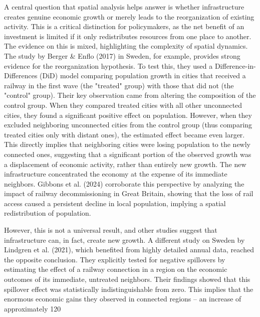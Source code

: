 \documentclass[12pt, a4paper]{article}
\begin{document}
A central question that spatial analysis helps answer is whether infrastructure creates genuine economic growth or merely leads to the reorganization of existing activity. This is a critical distinction for policymakers, as the net benefit of an investment is limited if it only redistributes resources from one place to another. The evidence on this is mixed, highlighting the complexity of spatial dynamics. The study by Berger & Enflo (2017) in Sweden, for example, provides strong evidence for the reorganization hypothesis. To test this, they used a Difference-in-Differences (DiD) model comparing population growth in cities that received a railway in the first wave (the "treated" group) with those that did not (the "control" group). Their key observation came from altering the composition of the control group. When they compared treated cities with all other unconnected cities, they found a significant positive effect on population. However, when they excluded neighboring unconnected cities from the control group (thus comparing treated cities only with distant ones), the estimated effect became even larger. This directly implies that neighboring cities were losing population to the newly connected ones, suggesting that a significant portion of the observed growth was a displacement of economic activity, rather than entirely new growth. The new infrastructure concentrated the economy at the expense of its immediate neighbors. Gibbons et al. (2024) corroborate this perspective by analyzing the impact of railway decommissioning in Great Britain, showing that the loss of rail access caused a persistent decline in local population, implying a spatial redistribution of population. 

However, this is not a universal result, and other studies suggest that infrastructure can, in fact, create new growth. A different study on Sweden by Lindgren et al. (2021), which benefited from highly detailed annual data, reached the opposite conclusion. They explicitly tested for negative spillovers by estimating the effect of a railway connection in a region on the economic outcomes of its immediate, untreated neighbors. Their findings showed that this spillover effect was statistically indistinguishable from zero. This implies that the enormous economic gains they observed in connected regions – an increase of approximately 120%
\end{document}
